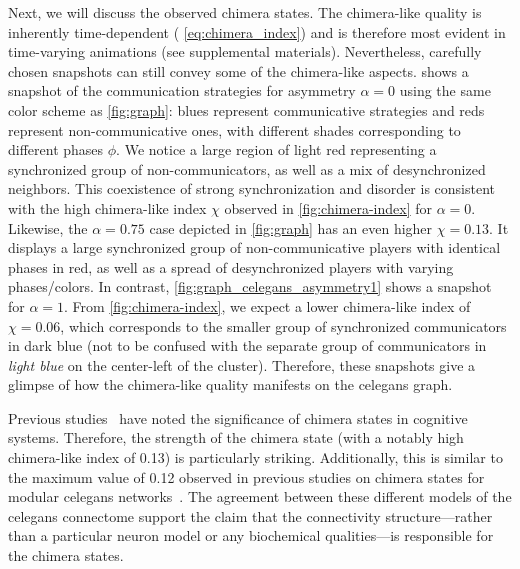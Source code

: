 \documentclass[pdflatex,twocolumn,sn-nature,super]{sn-jnl}
\begin{document}
Next, we will discuss the observed chimera states.
The chimera-like quality is inherently time-dependent
(\cf{} \cref{eq:chimera_index})
and is therefore most evident in time-varying animations (see supplemental materials).
Nevertheless, carefully chosen snapshots can still convey some of the chimera-like aspects.
 shows a snapshot of the communication strategies
for asymmetry $\alpha = 0$ using the same color scheme as \cref{fig:graph}:
blues represent communicative strategies
and reds represent non-communicative ones,
with different shades corresponding to different phases $\phi$.
We notice a large region of light red representing
a synchronized group of non-communicators,
as well as a mix of desynchronized neighbors.
This coexistence of strong synchronization and disorder
is consistent with the high
chimera-like index $\chi$ observed in \cref{fig:chimera-index} for $\alpha = 0$.
Likewise, the $\alpha = 0.75$ case depicted in \cref{fig:graph}
has an even higher $\chi = \num{0.13}$.
It displays a large
synchronized group of non-communicative players with identical phases in red,
as well as a spread of desynchronized players with varying phases/colors.
In contrast,
\cref{fig:graph_celegans_asymmetry1} shows a snapshot for $\alpha = 1$.
From \cref{fig:chimera-index}, we expect a lower chimera-like index
of $\chi = \num{0.06}$, which corresponds to the smaller group
of synchronized communicators in dark blue
(not to be confused with the separate group of communicators
in \emph{light blue} on the center-left of the cluster).
Therefore, these snapshots give a glimpse of how the chimera-like quality
manifests on the \gls{celegans} graph.

Previous studies~\citep{bansal2019cognitive,santos2017chimera}
have noted the significance of chimera states in cognitive systems.
Therefore, the strength of the chimera state
(with a notably high chimera-like index of \num{0.13}) is particularly striking.
Additionally, this is similar to the maximum value of \num{0.12}
observed in previous studies on chimera states
for modular \gls{celegans} networks~\citep{hizanidis2016chimera}.
The agreement between these different models
of the \gls{celegans} connectome
support the claim that the connectivity structure---rather than
a particular neuron model or any biochemical qualities---is responsible
for the chimera states.
\end{document}
